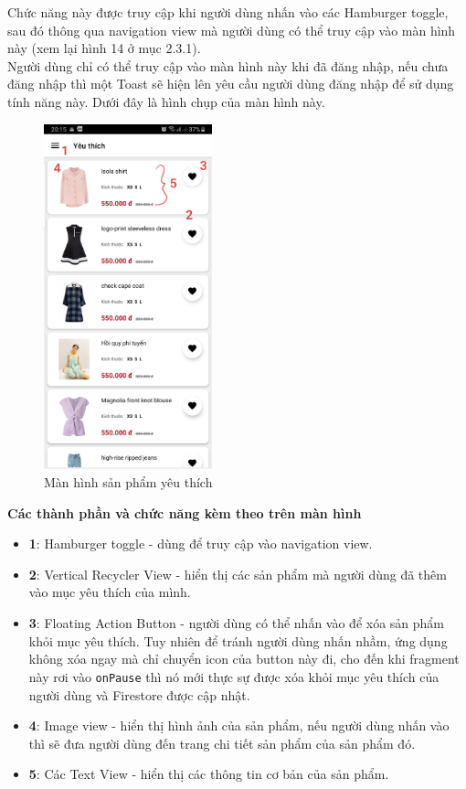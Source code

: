 \documentclass[12pt]{article}
\begin{document}
\indent Chức năng này được truy cập khi người dùng nhấn vào các Hamburger toggle, sau đó thông qua navigation view mà người dùng có thể truy cập vào màn hình này (xem lại hình 14 ở mục 2.3.1).\\

\indent Người dùng chỉ có thể truy cập vào màn hình này khi đã đăng nhập, nếu chưa đăng nhập thì một Toast sẽ hiện lên yêu cầu người dùng đăng nhập để sử dụng tính năng này. Dưới đây là hình chụp của màn hình này.

\begin{figure}[H]
    \centering
    \includegraphics[height=10cm]{images/25.png}
    \caption{Màn hình sản phẩm yêu thích}
\end{figure}

\indent \textbf{Các thành phần và chức năng kèm theo trên màn hình}
\begin{itemize}
    \item \textbf{1}: Hamburger toggle - dùng để truy cập vào navigation view.
    \item \textbf{2}: Vertical Recycler View - hiển thị các sản phẩm mà người dùng đã thêm vào mục yêu thích của mình.
    \item \textbf{3}: Floating Action Button - người dùng có thể nhấn vào để xóa sản phẩm khỏi mục yêu thích. Tuy nhiên để tránh người dùng nhấn nhầm, ứng dụng không xóa ngay mà chỉ chuyển icon của button này đi, cho đến khi fragment này rơi vào \texttt{onPause} thì nó mới thực sự được xóa khỏi mục yêu thích của người dùng và Firestore được cập nhật.
    \item \textbf{4}: Image view - hiển thị hình ảnh của sản phẩm, nếu người dùng nhấn vào thì sẽ đưa người dùng đến trang chi tiết sản phẩm của sản phẩm đó.
    \item \textbf{5}: Các Text View - hiển thị các thông tin cơ bản của sản phẩm.
\end{itemize}
\end{document}
